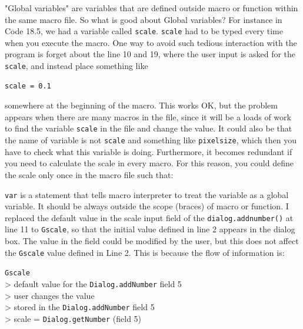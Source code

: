 \documentclass[11pt,a4paper,oneside]{report}
\newcommand{\ilcom}[1]{\texttt{\small#1}}
\newcommand{\tab}{\hspace*{3em}}
\begin{document}
"Global variables" are variables that are defined outside macro or function within the same macro file. So what is good about Global variables? For instance in Code 18.5, we had a variable called \ilcom{scale}. \ilcom{scale} had to be typed every time when you execute the macro. One way to avoid such tedious interaction with the program is forget about the line 10 and 19, where the user input is asked for the \ilcom{scale}, and instead place something like
\begin{lstlisting}[numbers=none]
scale = 0.1
\end{lstlisting}
somewhere at the beginning of the macro. This works OK, but the problem appears when there are many macros in the file, since it will be a loads of work to find the variable \ilcom{scale} in the file and change the value. It could also be that the name of variable is not \ilcom{scale} and something like \ilcom{pixelsize}, which then you have to check what this variable is doing. Furthermore, it becomes redundant if you need to calculate the scale in every macro. For this reason, you could define the scale only once in the macro file such that:



\ilcom{var} is a statement that tells macro interpreter to treat the variable as a global variable. It should be always outside the scope (braces) of macro or function. I replaced the default value in the scale input field of the \ilcom{dialog.addnumber()} at line 11 to \ilcom{Gscale}, so that the initial value defined in line 2 appears in the dialog box. The value in the field could be modified by the user, but this does not affect the \ilcom{Gscale} value defined in Line 2. This is because the flow of information is:

\ilcom{Gscale} \\
\tab > default value for the \ilcom{Dialog.addNumber} field 5 \\
\tab\tab > user changes the value  \\
\tab\tab\tab > stored in the \ilcom{Dialog.addNumber} field 5\\
\tab\tab\tab\tab > scale = \ilcom{Dialog.getNumber} (field 5)\\
\end{document}
